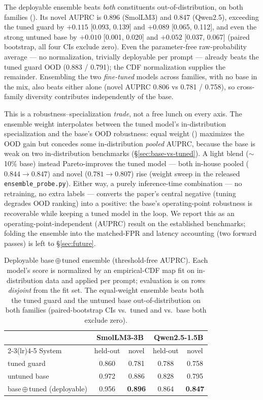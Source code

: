 \documentclass[sigconf,nonacm]{acmart}
\begin{document}
The deployable ensemble beats \emph{both} constituents out-of-distribution, on both families (). Its novel AUPRC is 0.896 (SmolLM3) and 0.847 (Qwen2.5), exceeding the tuned guard by $+0.115$ [0.093, 0.139] and $+0.089$ [0.065, 0.112], and even the strong untuned base by $+0.010$ [0.001, 0.020] and $+0.052$ [0.037, 0.067] (paired bootstrap, all four CIs exclude zero). Even the parameter-free raw-probability average --- no normalization, trivially deployable per prompt --- already beats the tuned guard OOD (0.883 / 0.791); the CDF normalization supplies the remainder. Ensembling the two \emph{fine-tuned} models across families, with no base in the mix, also beats either alone (novel AUPRC 0.806 vs 0.781 / 0.758), so cross-family diversity contributes independently of the base.

This is a robustness--specialization \emph{trade}, not a free lunch on every axis. The ensemble weight interpolates between the tuned model's in-distribution specialization and the base's OOD robustness: equal weight () maximizes the OOD gain but concedes some in-distribution \emph{pooled} AUPRC, because the base is weak on two in-distribution benchmarks (\S\ref{sec:base-vs-tuned}). A light blend ($\sim$10\% base) instead Pareto-improves the tuned model --- both in-house pooled ($0.844\!\to\!0.847$) and novel ($0.781\!\to\!0.807$) rise (weight sweep in the released \texttt{ensemble\_probe.py}). Either way, a purely inference-time combination --- no retraining, no extra labels --- converts the paper's central negative (tuning degrades OOD ranking) into a positive: the base's operating-point robustness is recoverable while keeping a tuned model in the loop. We report this as an operating-point-independent (AUPRC) result on the established benchmarks; folding the ensemble into the matched-FPR and latency accounting (two forward passes) is left to \S\ref{sec:future}.

\begin{table}[t]
\small
\centering
\setlength{\tabcolsep}{4pt}
\caption{Deployable base\,$\oplus$\,tuned ensemble (threshold-free AUPRC). Each model's score is normalized by an empirical-CDF map fit on in-distribution data and applied per prompt; evaluation is on rows \emph{disjoint} from the fit set. The equal-weight ensemble beats both the tuned guard and the untuned base out-of-distribution on both families (paired-bootstrap CIs vs.\ tuned and vs.\ base both exclude zero).}
\label{tab:ensemble}
\begin{tabular}{lcccc}
\toprule
 & \multicolumn{2}{c}{SmolLM3-3B} & \multicolumn{2}{c}{Qwen2.5-1.5B} \\
\cmidrule(lr){2-3}\cmidrule(lr){4-5}
System & held-out & novel & held-out & novel \\
\midrule
tuned guard  & 0.860 & 0.781 & 0.788 & 0.758 \\
untuned base & 0.972 & 0.886 & 0.828 & 0.795 \\
base\,$\oplus$\,tuned (deployable) & 0.956 & \textbf{0.896} & 0.864 & \textbf{0.847} \\
\bottomrule
\end{tabular}
\end{table}
\end{document}
